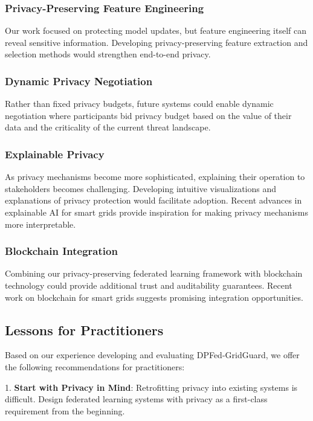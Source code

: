 \documentclass{ieeeaccess}
\theoremstyle{definition}
\begin{document}
\subsubsection{Privacy-Preserving Feature Engineering}
Our work focused on protecting model updates, but feature engineering itself can reveal sensitive information. Developing privacy-preserving feature extraction and selection methods would strengthen end-to-end privacy.

\subsubsection{Dynamic Privacy Negotiation}
Rather than fixed privacy budgets, future systems could enable dynamic negotiation where participants bid privacy budget based on the value of their data and the criticality of the current threat landscape.

\subsubsection{Explainable Privacy}
As privacy mechanisms become more sophisticated, explaining their operation to stakeholders becomes challenging. Developing intuitive visualizations and explanations of privacy protection would facilitate adoption. Recent advances in explainable AI for smart grids \cite{diab2025explainable, krauss2024explainability, zhang2020explainable} provide inspiration for making privacy mechanisms more interpretable.

\subsubsection{Blockchain Integration}
Combining our privacy-preserving federated learning framework with blockchain technology could provide additional trust and auditability guarantees. Recent work on blockchain for smart grids \cite{mollah2021blockchain, mylrea2019blockchain, liang2017blockchain, badra2025efficient, naveed2024blockchain, alsaedi2024blockchain} suggests promising integration opportunities.

\subsection{Lessons for Practitioners}

Based on our experience developing and evaluating DPFed-GridGuard, we offer the following recommendations for practitioners:

1. \textbf{Start with Privacy in Mind}: Retrofitting privacy into existing systems is difficult. Design federated learning systems with privacy as a first-class requirement from the beginning.
\end{document}
